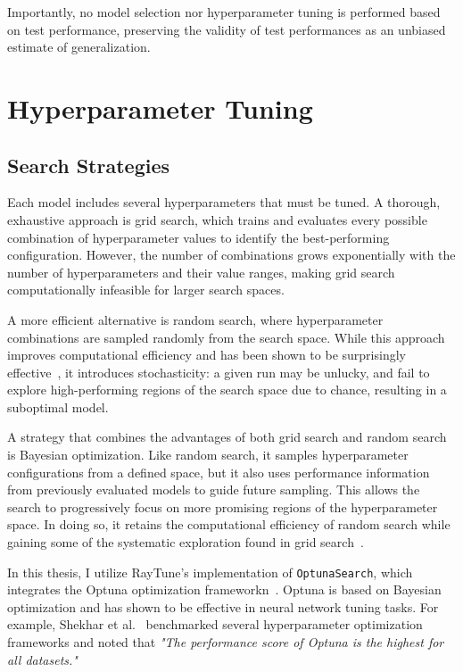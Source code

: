 Importantly, no model selection nor hyperparameter tuning is performed based on test performance, preserving the validity of test performances as an unbiased estimate of generalization.

\section{Hyperparameter Tuning}\label{HyperparameterTuning}

\subsection{Search Strategies}

Each model includes several hyperparameters that must be tuned. A thorough, exhaustive approach is grid search, which trains and evaluates every possible combination of hyperparameter values to identify the best-performing configuration. However, the number of combinations grows exponentially with the number of hyperparameters and their value ranges, making grid search computationally infeasible for larger search spaces. 

A more efficient alternative is random search, where hyperparameter combinations are sampled randomly from the search space. While this approach improves computational efficiency and has been shown to be surprisingly effective~\cite{bergstra2012random}, it introduces stochasticity: a given run may be unlucky, and fail to explore high-performing regions of the search space due to chance, resulting in a suboptimal model.

A strategy that combines the advantages of both grid search and random search is Bayesian optimization. Like random search, it samples hyperparameter configurations from a defined space, but it also uses performance information from previously evaluated models to guide future sampling. This allows the search to progressively focus on more promising regions of the hyperparameter space. In doing so, it retains the computational efficiency of random search while gaining some of the systematic exploration found in grid search~\cite{snoek2012practical}.

In this thesis, I utilize RayTune's implementation of \texttt{OptunaSearch}, which integrates the Optuna optimization frameworkn~\cite{akiba2019optuna}. Optuna is based on Bayesian optimization and has shown to be effective in neural network tuning tasks. For example, Shekhar et al.~\cite{shekhar2021comparative} benchmarked several hyperparameter optimization frameworks and noted that \textit{"The performance score of Optuna is the highest for all datasets."}

